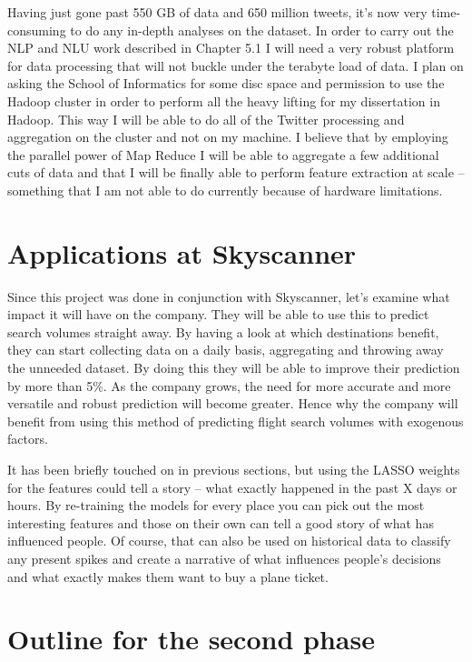 \documentclass[minf,twoside,singlespacing,parskip,frontabs,notimes,11pt]{infthesis}
\begin{document}
Having just gone past 550 GB of data and 650 million tweets, it's now very time-consuming to do any in-depth analyses on the dataset. In order to carry out the NLP and NLU work described in Chapter 5.1 I will need a very robust platform for data processing that will not buckle under the terabyte load of data. I plan on asking the School of Informatics for some disc space and permission to use the Hadoop cluster in order to perform all the heavy lifting for my dissertation in Hadoop. This way I will be able to do all of the Twitter processing and aggregation on the cluster and not on my machine. I believe that by employing the parallel power of Map Reduce I will be able to aggregate a few additional cuts of data and that I will be finally able to perform feature extraction at scale -- something that I am not able to do currently because of hardware limitations. 


\section{Applications at Skyscanner}


Since this project was done in conjunction with Skyscanner, let's examine what impact it will have on the company. 
They will be able to use this to predict search volumes straight away. By having a look at which destinations benefit, they can start collecting data on a daily basis, aggregating and throwing away the unneeded dataset. By doing this they will be able to improve their prediction by more than 5\%. As the company grows, the need for more accurate and more versatile and robust prediction will become greater. Hence why the company will benefit from using this method of predicting flight search volumes with exogenous factors. 


It has been briefly touched on in previous sections, but using the LASSO weights for the features could tell a story -- what exactly happened in the past X days or hours. By re-training the models for every place you can pick out the most interesting features and those on their own can tell a good story of what has influenced people. Of course, that can also be used on historical data to classify any present spikes and create a narrative of what influences people's decisions and what exactly makes them want to buy a plane ticket. 

\section{Outline for the second phase}
\end{document}
